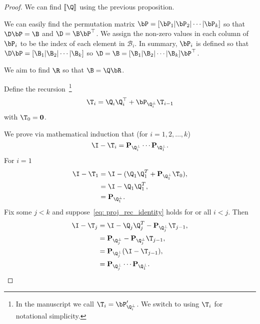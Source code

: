 \begin{proof}
    We can find $[\![\Q]\!]$ using the previous proposition.

    We can easily find the permutation matrix $\bP = [\bP_1|\bP_2|\cdots |\bP_k]$ so that $\D\bP = \B$ and $\D = \B \bP^\top$. We assign the non-zero values in each column of $\bP_i$ to be the index of each element in $\mathcal{B}_i$. In summary, $\bP_i$ is defined so that $\D\bP= [\B_1|\B_2|\cdots|\B_k]$ so $\D = \B = [\B_1|\B_2|\cdots|\B_k]\bP^\top$.

    We aim to find $\R$ so that $\B = \Q \bR$.

    Define the recursion~\footnote{In the manuscript we call $\T_i = \bP^\prime_{\Q_i^\perp}$. We switch to using $\T_i$ for notational simplicity.}
    \begin{equation}
        \T_i = \Q_i \Q_i^\top + \bP_{\Q_i^\perp} \T_{i-1}
    \end{equation}
    with $\T_0 = \mathbf{0}$.

    We prove via mathematical induction that (for $i=1,2,\dots,k$)
    \begin{equation}\label{eq: proj_rec_identity}
        \I -  \T_i = \mathbf{P}_{\Q_i^\perp} \cdots \mathbf{P}_{\Q_1^\perp}.
    \end{equation}
    For $i=1$ 
    \begin{align}
         \I -  \T_{1} &= \I - (\Q_1 \Q_1^T + \mathbf{P}_{\Q_1^\perp} \T_{0}),\\
           &= \I - \Q_1 \Q_1^T,\\
           &= \mathbf{P}_{\Q_1^\perp}.
    \end{align}
    Fix some $j < k$ and suppose~\cref{eq: proj_rec_identity} holds for or all $i < j$. Then
    \begin{align}
        \I -  \T_j &= \I - \Q_j \Q_j^T - \mathbf{P}_{\Q_j^\perp} \T_{j-1},\\
         &=\mathbf{P}_{\Q_j^\perp} - \mathbf{P}_{\Q_j^\perp} \T_{j-1},\\
        &=\mathbf{P}_{\Q_j^\perp}(\I - \T_{j-1}),\\
        &= \mathbf{P}_{\Q_j^\perp} \cdots \mathbf{P}_{\Q_1^\perp}.
    \end{align}
    

\end{proof}
